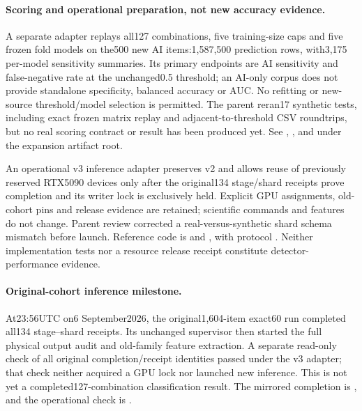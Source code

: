 \paragraph{Scoring and operational preparation, not new accuracy evidence.}
A separate adapter replays all127 combinations, five training-size caps and five
frozen fold models on the500 new AI items:1,587,500 prediction rows, with3,175
per-model sensitivity summaries. Its primary endpoints are AI sensitivity and
false-negative rate at the unchanged0.5 threshold; an AI-only corpus does not
provide standalone specificity, balanced accuracy or AUC. No refitting or
new-source threshold/model selection is permitted. The parent reran17 synthetic
tests, including exact frozen matrix replay and adjacent-to-threshold CSV
roundtrips, but no real scoring contract or result has been produced yet.
See ,
, and
 under the expansion artifact root.

An operational v3 inference adapter preserves v2 and allows reuse of previously
reserved RTX5090 devices only after the original134 stage/shard receipts prove
completion and its writer lock is exclusively held. Explicit GPU assignments,
old-cohort pins and release evidence are retained; scientific commands and
features do not change. Parent review corrected a real-versus-synthetic shard
schema mismatch before launch. Reference code is
 and
, with protocol
. Neither implementation tests nor a resource
release receipt constitute detector-performance evidence.

\paragraph{Original-cohort inference milestone.}
At23:56UTC on6 September2026, the original1,604-item exact60 run completed
all134 stage--shard receipts. Its unchanged supervisor then started the full
physical output audit and old-family feature extraction. A separate read-only
check of all original completion/receipt identities passed under the v3 adapter;
that check neither acquired a GPU lock nor launched new inference. This is not
yet a completed127-combination classification result. The mirrored completion
is , and the operational
check is .

